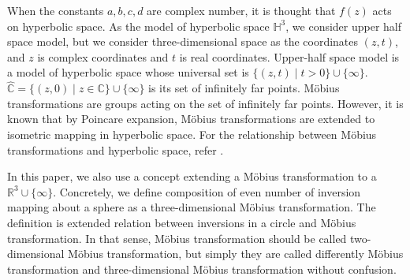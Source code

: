 When the constants $a, b, c, d$ are complex number, it is thought that
$f(z)$ acts on hyperbolic space.
As the model of hyperbolic space $\mathbb{H}^3$, we consider upper half
space model, but we consider three-dimensional space as the coordinates
$(z, t)$, and $z$ is complex coordinates and $t$ is real coordinates.
Upper-half space model is a model of hyperbolic space whose universal
set is $\{(z,t) \mid t>0\}\cup \{ \infty \}$.
$\hat{\mathbb{C}} = \{ (z,0) \mid z \in \mathbb{C}\} \cup \{ \infty\}$
is its set of infinitely far points. M\"obius transformations are groups acting on
the set of infinitely far points. However, it is known that by Poincare
expansion, M\"obius transformations are extended to isometric mapping
in hyperbolic space.
For the relationship between M\"obius transformations and hyperbolic
space, refer 
\cite{Marden200705outerCircles}\cite{taniguchi_okumura199610invitation}.

In this paper, we also use a concept extending a M\"obius
transformation to a $\mathbb{R}^3\cup\{\infty\}$.
Concretely, we define composition of even number of inversion mapping
about a sphere as a three-dimensional M\"obius transformation.
The definition is extended relation between inversions in a circle and
M\"obius transformation.
In that sense, M\"obius transformation should be called two-dimensional
M\"obius transformation, but
simply they are called differently M\"obius transformation and
three-dimensional M\"obius transformation without confusion.

